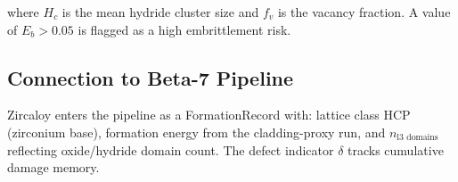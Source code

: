 \documentclass[12pt]{article}
\begin{document}
where $H_c$ is the mean hydride cluster size and $f_v$ is the vacancy fraction.
A value of $E_b > 0.05$ is flagged as a high embrittlement risk.

\subsection{Connection to Beta-7 Pipeline}

Zircaloy enters the pipeline as a FormationRecord with:
lattice class HCP (zirconium base), formation energy from the cladding-proxy run,
and $n_{\text{l3 domains}}$ reflecting oxide/hydride domain count.
The defect indicator $\delta$ tracks cumulative damage memory.

\end{document}
